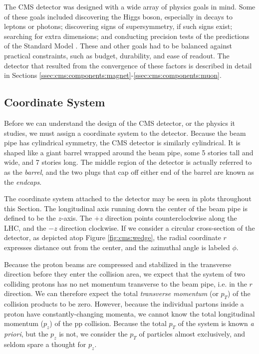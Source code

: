 The CMS detector was designed with a wide array of physics goals in
mind. Some of these goals included discovering the Higgs boson,
especially in decays to leptons or photons; discovering signs of
supersymmetry, if such signs exist; searching for extra
dimensions; and conducting precision tests of the predictions of the
Standard Model \cite{tdr}.
These and other goals had to be balanced against practical
constraints, such as budget, durability, and ease of readout. The
detector that resulted from the convergence of these factors is
described in detail in Sections
\ref{ssec:cms:components:magnet}-\ref{ssec:cms:components:muon}.

\subsection{Coordinate System}
\label{ssec:cms:coordinates}


Before we can understand the design of the CMS detector, or the
physics it studies, we must assign a coordinate system to the detector.
Because the beam pipe has cylindrical symmetry, the CMS detector is
similarly cylindrical. It is shaped like a giant barrel wrapped around
the beam pipe, some 5 stories tall and wide, and 7 stories
long. The middle region of the detector is actually referred to as the
\emph{barrel}, and the two plugs that cap off either end of the barrel
are known as the \emph{endcaps}.

The coordinate system attached to the detector may be seen in
plots throughout this Section. The longitudinal axis running down the
center of the beam pipe is defined to be the $z$-axis. The $+z$
direction points counterclockwise along the LHC, and the $-z$
direction clockwise. If we consider a circular
cross-section of the detector, as depicted atop Figure
\ref{fig:cms:wedge}, the radial coordinate $r$ expresses distance out from
the center, and the azimuthal angle is labeled $\phi$.

Because the proton beams are compressed and stabilized in the
transverse direction before they enter the collision area, we expect
that the system of two colliding protons has no net momentum
transverse to the beam pipe, i.e. in the $r$ direction. We can
therefore expect the total \emph{transverse momentum} (or $p_T$) of
the collision products to be zero. However, because the individual
partons inside a proton have constantly-changing momenta, we cannot
know the total longitudinal momentum ($p_z$) of the pp
collision. Because the total $p_T$ of the system is known \textit{a priori},
but the $p_z$ is not, we consider the $p_T$ of particles almost
exclusively, and seldom spare a thought for $p_z$.

